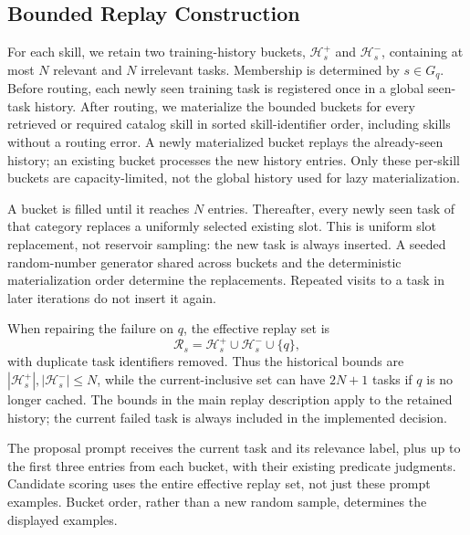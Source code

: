 \subsection{Bounded Replay Construction}
\label{app:procedure-replay}
For each skill, we retain two training-history buckets, $\mathcal H_s^+$ and $\mathcal H_s^-$, containing at most $N$ relevant and $N$ irrelevant tasks. Membership is determined by $s\in G_q$. Before routing, each newly seen training task is registered once in a global seen-task history. After routing, we materialize the bounded buckets for every retrieved or required catalog skill in sorted skill-identifier order, including skills without a routing error. A newly materialized bucket replays the already-seen history; an existing bucket processes the new history entries. Only these per-skill buckets are capacity-limited, not the global history used for lazy materialization.

A bucket is filled until it reaches $N$ entries. Thereafter, every newly seen task of that category replaces a uniformly selected existing slot. This is uniform slot replacement, not reservoir sampling: the new task is always inserted. A seeded random-number generator shared across buckets and the deterministic materialization order determine the replacements. Repeated visits to a task in later iterations do not insert it again.

When repairing the failure on $q$, the effective replay set is
\[
\mathcal R_s=\mathcal H_s^+\cup\mathcal H_s^-\cup\{q\},
\]
with duplicate task identifiers removed. Thus the historical bounds are $|\mathcal H_s^+|,|\mathcal H_s^-|\leq N$, while the current-inclusive set can have $2N+1$ tasks if $q$ is no longer cached. The bounds in the main replay description apply to the retained history; the current failed task is always included in the implemented decision.

The proposal prompt receives the current task and its relevance label, plus up to the first three entries from each bucket, with their existing predicate judgments. Candidate scoring uses the entire effective replay set, not just these prompt examples. Bucket order, rather than a new random sample, determines the displayed examples.
